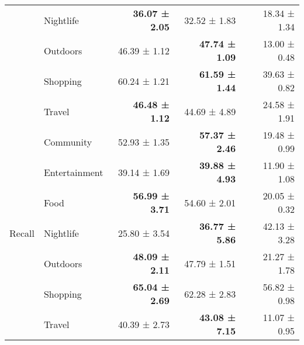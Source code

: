 \begin{table}[htbp]
{\begin{tabular}{|ll|r|r|r|}
\multicolumn{1}{|l|}{}                           & Nightlife     & \textbf{36.07 ± 2.05}             & 32.52 ± 1.83                         & 18.34 ± 1.34                       \\ \cline{2-5} 
\multicolumn{1}{|l|}{}                           & Outdoors      & 46.39 ± 1.12                      & \textbf{47.74 ± 1.09}                & 13.00 ± 0.48                       \\ \cline{2-5} 
\multicolumn{1}{|l|}{}                           & Shopping      & 60.24 ± 1.21                      & \textbf{61.59 ± 1.44}                & 39.63 ± 0.82                       \\ \cline{2-5} 
\multicolumn{1}{|l|}{}                           & Travel        & \textbf{46.48 ± 1.12}             & 44.69 ± 4.89                         & 24.58 ± 1.91                       \\ \hline
\multicolumn{1}{|l|}{\multirow{7}{*}{Recall}}    & Community     & 52.93 ± 1.35                      & \textbf{57.37 ± 2.46}                & 19.48 ± 0.99                       \\ \cline{2-5} 
\multicolumn{1}{|l|}{}                           & Entertainment & 39.14 ± 1.69                      & \textbf{39.88 ± 4.93}                & 11.90 ± 1.08                       \\ \cline{2-5} 
\multicolumn{1}{|l|}{}                           & Food          & \textbf{56.99 ± 3.71}             & 54.60 ± 2.01                         & 20.05 ± 0.32                       \\ \cline{2-5} 
\multicolumn{1}{|l|}{}                           & Nightlife     & 25.80 ± 3.54                      & \textbf{36.77 ± 5.86}                & 42.13 ± 3.28                       \\ \cline{2-5} 
\multicolumn{1}{|l|}{}                           & Outdoors      & \textbf{48.09 ± 2.11}             & 47.79 ± 1.51                         & 21.27 ± 1.78                       \\ \cline{2-5} 
\multicolumn{1}{|l|}{}                           & Shopping      & \textbf{65.04 ± 2.69}             & 62.28 ± 2.83                         & 56.82 ± 0.98                       \\ \cline{2-5} 
\multicolumn{1}{|l|}{}                           & Travel        & 40.39 ± 2.73                      & \textbf{43.08 ± 7.15}                & 11.07 ± 0.95                       \\ \hline
\end{tabular}%
}
\label{table:cat}
\end{table}